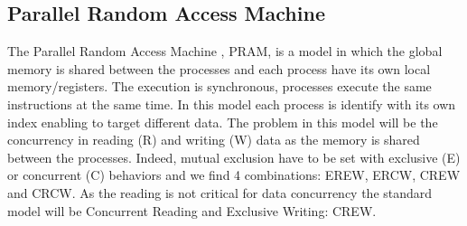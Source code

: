 \subsection{Parallel Random Access Machine}
The Parallel Random Access Machine \cite{fortune1978parallelism}, PRAM, is a model in which the global memory is shared between the processes and each process have its own local memory/registers.
The execution is synchronous, processes execute the same instructions at the same time. 
In this model each process is identify with its own index enabling to target different data. 
The problem in this model will be the concurrency in reading (R) and writing (W) data as the memory is shared between the processes.
Indeed, mutual exclusion have to be set with exclusive (E) or concurrent (C) behaviors and we find 4 combinations: EREW, ERCW, CREW and CRCW.
As the reading is not critical for data concurrency the standard model will be Concurrent Reading and Exclusive Writing: CREW.


